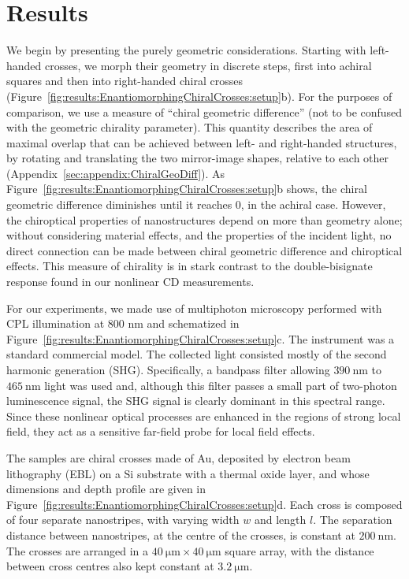 \section{Results}\label{sec:results:EnantiomorphingChiralCrosses:results}

We begin by presenting the purely geometric considerations. Starting with left-handed crosses, we morph their geometry in discrete steps, first into achiral squares and then into right-handed chiral crosses (Figure~\ref{fig:results:EnantiomorphingChiralCrosses:setup}b). For the purposes of comparison, we use a measure of ``chiral geometric difference'' (not to be confused with the geometric chirality parameter). 
This quantity describes the area of maximal overlap that can be achieved between left- and right-handed structures, by rotating and translating the two mirror-image shapes, relative to each other (Appendix~\ref{sec:appendix:ChiralGeoDiff}). 
As Figure~\ref{fig:results:EnantiomorphingChiralCrosses:setup}b shows, the chiral geometric difference diminishes until it reaches 0, in the achiral case. However, the chiroptical properties of nanostructures depend on more than geometry alone; without considering material effects, and the properties of the incident light, no direct connection can be made between chiral geometric difference and chiroptical effects. This measure of chirality is in stark contrast to the double-bisignate response found in our nonlinear CD measurements.

For our experiments, we made use of multiphoton microscopy performed with CPL illumination at 800 nm and schematized in Figure~\ref{fig:results:EnantiomorphingChiralCrosses:setup}c. The instrument was a standard commercial model. The collected light consisted mostly of the second harmonic generation (SHG). Specifically, a bandpass filter allowing $\SI{390}{\nano\m}$ to $\SI{465}{\nano\m}$ light was used and, although this filter passes a small part of two-photon luminescence signal, the SHG signal is clearly dominant in this spectral range. Since these nonlinear optical processes are enhanced in the regions of strong local field, \cite{Wang2013, Chen1983} they act as a sensitive far-field probe for local field effects. 

The samples are chiral crosses made of Au, deposited by electron beam lithography (EBL) on a Si substrate with a thermal oxide layer, and whose dimensions and depth profile are given in Figure~\ref{fig:results:EnantiomorphingChiralCrosses:setup}d. Each cross is composed of four separate nanostripes, with varying width $w$ and length $l$. The separation distance between nanostripes, at the centre of the crosses, is constant at $\SI{200}{\nano\m}$. The crosses are arranged in a $\SI{40}{\micro\m} \times \SI{40}{\micro\m}$ square array, with the distance between cross centres also kept constant at $\SI{3.2}{\micro\m}$. 

